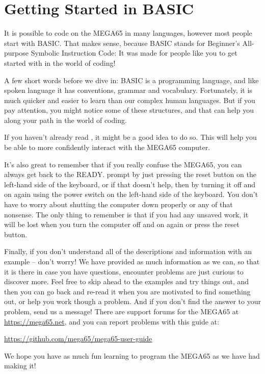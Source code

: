 \chapter{Getting Started in BASIC}
\label{cha:basic-getting-started}

It is possible to code on the MEGA65 in many languages,
however most people start with BASIC.  That makes sense,
because BASIC stands for Beginner's All-purpose Symbolic
Instruction Code: It was made for people like you to get
started with in the world of coding!

A few short words before we dive in: BASIC is a programming
language, and like spoken language it has conventions, grammar
and vocabulary.  Fortunately, it is much quicker and easier
to learn than our complex human languages. But if you pay
attention, you might notice some of these structures, and that
can help you along your path in the world of coding.

If you haven't already read ,
it might be a good idea to do so. This will help you be able to
more confidently interact with the MEGA65 computer.

It's also great to remember that if you really confuse the MEGA65,
you can always get back to the READY. prompt by just pressing the
reset button on the left-hand side of the keyboard, or if that
doesn't help, then by turning it off
and on again using the power switch on the left-hand side of the keyboard.
You don't have to worry about shutting the computer
down properly or any of that nonsense.  The only thing to remember
is that if you had any unsaved work, it will be lost when you turn
the computer off and on again or press the reset button.

Finally, if you don't understand all of the descriptions and information
with an example -- don't worry! We have provided as much information
as we can, so that it is there in case you have questions, encounter problems are
just curious to discover more.  Feel free to skip ahead to the examples
and try things out, and then you can go back and re-read it when you are motivated
to find something out, or help you work though a problem.  And if you don't find
the answer to your problem, send us a message!  There are support forums for the
MEGA65 at \url{https://mega65.net}, and you can
report problems with this guide at:

\url{https://github.com/mega65/mega65-user-guide}

We hope you have as much fun learning to program the MEGA65 as
we have had making it!

